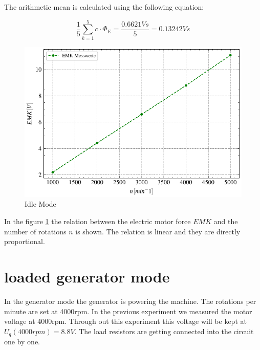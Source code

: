 \documentclass[conference]{IEEEtran}
\begin{document}
The arithmetic mean is calculated using the following equation:

\begin{equation}
    \frac{1}{5}\sum\limits_{k = 1}^{5} c \cdot \Phi_E = \frac{0.6621Vs}{5} = 0.13242Vs
\end{equation}

\begin{figure}[htbp]
    \centering
    \includegraphics[width=\columnwidth]{plots/4.1_Leerlaufversuch.pdf}
    \caption{Idle Mode}
    \label{fig:emk_n}
\end{figure}



In the figure \ref{fig:emk_n} the relation between the electric motor force
$EMK$ and the number of rotations $n$ is shown. The relation is linear and they
are directly proportional.


\section{loaded generator mode}
In the generator mode the generator is powering the machine. The rotations per minute are set at 4000rpm.
In the previous experiment we measured the motor voltage at 4000rpm. Through out this experiment this voltage will be kept at $U_q(4000rpm) = 8.8V$.
The load resistors are getting connected into the circuit one by one.
\end{document}

